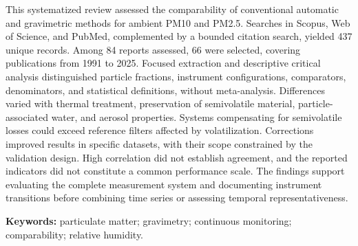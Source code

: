 \noindent This systematized review assessed the comparability of conventional automatic and gravimetric methods for ambient PM10 and PM2.5. Searches in Scopus, Web of Science, and PubMed, complemented by a bounded citation search, yielded 437 unique records. Among 84 reports assessed, 66 were selected, covering publications from 1991 to 2025. Focused extraction and descriptive critical analysis distinguished particle fractions, instrument configurations, comparators, denominators, and statistical definitions, without meta-analysis. Differences varied with thermal treatment, preservation of semivolatile material, particle-associated water, and aerosol properties. Systems compensating for semivolatile losses could exceed reference filters affected by volatilization. Corrections improved results in specific datasets, with their scope constrained by the validation design. High correlation did not establish agreement, and the reported indicators did not constitute a common performance scale. The findings support evaluating the complete measurement system and documenting instrument transitions before combining time series or assessing temporal representativeness.
\par\vspace{.5em}
\noindent\textbf{Keywords:} particulate matter; gravimetry; continuous monitoring; comparability; relative humidity.\par
